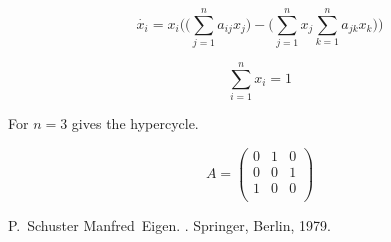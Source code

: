 \documentclass{article}
\begin{document}
\begin{equation*}
\dot{x_i} = x_i\Big(\Big(\sum_{j=1}^{n}a_{ij}x_j \Big)- \Big(\sum_{j=1}^{n}x_j\sum_{k=1}^{n}a_{jk}x_k\Big)\Big)
\end{equation*}

\begin{equation*}
\sum_{i=1}^n x_i = 1
\end{equation*}

For $n=3$ gives the hypercycle.

\begin{equation*}
A=
\begin{pmatrix}
0 & 1 & 0 \\
0 & 0 & 1 \\
1 & 0 & 0 \\
\end{pmatrix}
\end{equation*}


P.~Schuster Manfred~Eigen.
.
\newblock Springer, Berlin, 1979.
\end{document}
